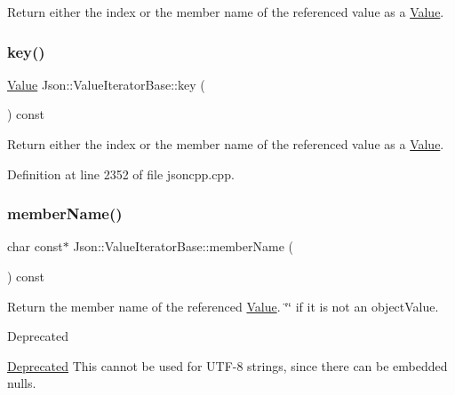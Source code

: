 Return either the index or the member name of the referenced value as a \hyperlink{class_json_1_1_value}{Value}. \hypertarget{class_json_1_1_value_iterator_base_a3838ba39c43c518cf3ed4aa6ce78ccad}{}\label{class_json_1_1_value_iterator_base_a3838ba39c43c518cf3ed4aa6ce78ccad} 
\subsubsection{\texorpdfstring{key()}{key()}\hspace{0.1cm}{\footnotesize\ttfamily [2/2]}}
{\footnotesize\ttfamily \hyperlink{class_json_1_1_value}{Value} Json\+::\+Value\+Iterator\+Base\+::key (\begin{DoxyParamCaption}{ }\end{DoxyParamCaption}) const}

Return either the index or the member name of the referenced value as a \hyperlink{class_json_1_1_value}{Value}. 

Definition at line 2352 of file jsoncpp.\+cpp.

\hypertarget{class_json_1_1_value_iterator_base_a8e61d61ab80155e4a356540bf60cfc04}{}\label{class_json_1_1_value_iterator_base_a8e61d61ab80155e4a356540bf60cfc04} 
\subsubsection{\texorpdfstring{member\+Name()}{memberName()}\hspace{0.1cm}{\footnotesize\ttfamily [1/4]}}
{\footnotesize\ttfamily char const$\ast$ Json\+::\+Value\+Iterator\+Base\+::member\+Name (\begin{DoxyParamCaption}{ }\end{DoxyParamCaption}) const}

Return the member name of the referenced \hyperlink{class_json_1_1_value}{Value}. \char`\"{}\char`\"{} if it is not an object\+Value. \begin{DoxyRefDesc}{Deprecated}
\item[\hyperlink{deprecated__deprecated000016}{Deprecated}]This cannot be used for U\+T\+F-\/8 strings, since there can be embedded nulls. \end{DoxyRefDesc}
\hypertarget{class_json_1_1_value_iterator_base_a4f48ce7b1f727682c340f1c7a25bd2e1}{}\label{class_json_1_1_value_iterator_base_a4f48ce7b1f727682c340f1c7a25bd2e1} 
